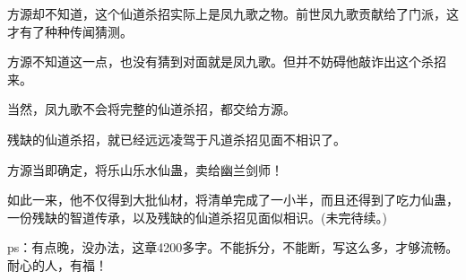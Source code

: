\begin{this_body}
方源却不知道，这个仙道杀招实际上是凤九歌之物。前世凤九歌贡献给了门派，这才有了种种传闻猜测。

方源不知道这一点，也没有猜到对面就是凤九歌。但并不妨碍他敲诈出这个杀招来。

当然，凤九歌不会将完整的仙道杀招，都交给方源。

残缺的仙道杀招，就已经远远凌驾于凡道杀招见面不相识了。

方源当即确定，将乐山乐水仙蛊，卖给幽兰剑师！

如此一来，他不仅得到大批仙材，将清单完成了一小半，而且还得到了吃力仙蛊，一份残缺的智道传承，以及残缺的仙道杀招见面似相识。(未完待续。)

ps：有点晚，没办法，这章4200多字。不能拆分，不能断，写这么多，才够流畅。耐心的人，有福！

\end{this_body}


